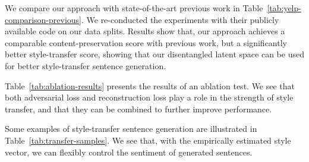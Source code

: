 \documentclass[11pt,a4paper]{article}
\begin{document}
We compare our approach with state-of-the-art previous work in Table~\ref{tab:yelp-comparison-previous}. We re-conducted the experiments with their publicly available code on our data splits.
Results show that, our approach achieves a comparable content-preservation score with previous work, but a significantly better style-transfer score, showing that our disentangled latent space can be used for better style-transfer sentence generation.

Table~\ref{tab:ablation-results} presents the results of an ablation test. We see that both adversarial loss and reconstruction loss play a role in the strength of style transfer, and that they can be combined to further improve performance.


Some examples of style-transfer sentence generation are illustrated in Table~\ref{tab:transfer-samples}. We see that, with the empirically estimated style vector, we can flexibly control the sentiment of generated sentences.


\begin{table}[!t]
	\centering
	\caption{Examples of style-transfer generation.}
	\label{tab:transfer-samples}
\end{table}
\end{document}
